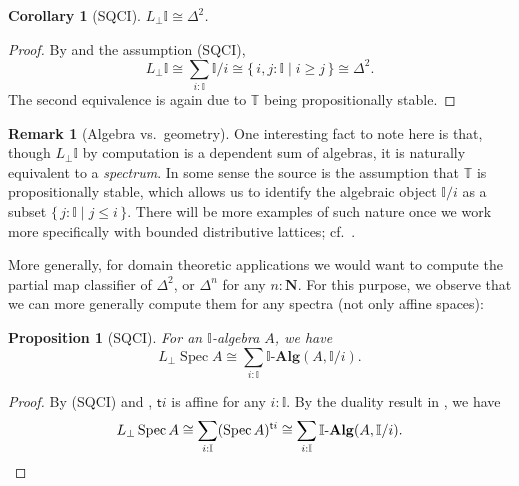 \documentclass[12pt]{amsart}
\newtheorem{corollary}[theorem]{Corollary}
\newtheorem{proposition}[theorem]{Proposition}
\theoremstyle{definition}
\newtheorem{remark}[theorem]{Remark}
\newtheorem*{axiom}{Axiom}
\newcommand{\mb}[1]{\mathbf{#1}}
\newcommand{\mbb}[1]{\mathbb{#1}}
\newcommand{\T}{\mbb T}
\newcommand{\I}{\mbb I}
\newcommand{\ms}[1]{\mathsf{#1}}
\newcommand{\alg}{\text{-}\mb{Alg}}
\newcommand{\scomp}[2]{\{\,#1\mid#2\,\}}
\newcommand{\N}{\mb N}
\newcommand{\prt}{_{\bot}}
\newcommand{\spec}{\operatorname{Spec}}
\begin{document}
\begin{corollary}[SQCI]
  $L\prt \I \cong \Delta^2$.
\end{corollary}
\begin{proof}
  By  and the assumption (SQCI),
  \[ L\prt\I \cong \sum_{i:\I}\I/i \cong \scomp{i,j : \I}{i \ge j} \cong \Delta^2. \]
  The second equivalence is again due to $\T$ being propositionally stable.
\end{proof}

\begin{remark}[Algebra vs.\ geometry]\label{rem:alggeoI}
  One interesting fact to note here is that, though $L\prt\I$ by computation is a dependent sum of algebras, it is naturally equivalent to a \emph{spectrum}. In some sense the source is the assumption that $\T$ is propositionally stable, which allows us to identify the algebraic object $\I/i$ as a subset $\scomp{j : \I}{j \le i}$. There will be more examples of such nature once we work more specifically with bounded distributive lattices; cf.\ .
\end{remark}

More generally, for domain theoretic applications we would want to compute the partial map classifier of $\Delta^2$, or $\Delta^n$ for any $n:\N$. For this purpose, we observe that we can more generally compute them for any spectra (not only affine spaces):

\begin{proposition}[SQCI]\label{prop:liftofaffine}
  For an $\I$-algebra $A$, we have
  \[ L\prt\spec A \cong \sum_{i:\I}\I\alg(A,\I/i). \]
\end{proposition}
\begin{proof}
  By (SQCI) and , $\ms ti$ is affine for any $i:\I$. By the duality result in , we have
  \[ L\prt\spec A \cong \sum_{i:\I}(\spec A)^{\ms ti}\cong \sum_{i:\I}\I\alg(A,\I/i). \qedhere \]
\end{proof}



\end{document}

